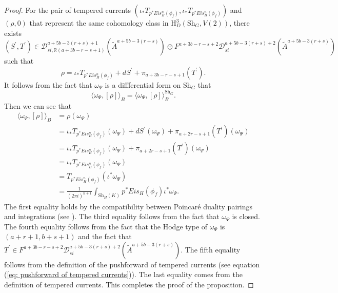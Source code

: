 \documentclass[11pt, a4paper]{amsart}
\theoremstyle{plain}
\theoremstyle{definition}
\numberwithin{equation}{section}
\def\RR{\mathbb{R}}
\newcommand{\Sh}{\mathrm{Sh}}
\begin{document}
\begin{proof}
    For the pair of tempered currents $(\iota_{*}T_{p^{*}Eis_{H}^{n}(\phi_f)}, \iota_{*} T_{p^{*}Eis_{B}^{n}(\phi_f)})$ and $(\rho, 0)$ that represent the same cohomology class in $\mathrm{H}^{3}_{D} (\Sh_{G}, V(2))$, there exists 
    \begin{equation*}
        (S^{\prime}, T^{\prime}) \in \mathcal{D}_{si, \RR(a + 3b -r - s + 1)}^{a + 5b - 3(r + s) + 1}(\widetilde{A}^{a + 5b - 3(r + s)}) \oplus F^{a + 3b -r - s + 2} \mathcal{D}_{si}^{a + 5b - 3(r + s) + 2}(\widetilde{A}^{a + 5b - 3(r + s)})
    \end{equation*}
    such that 
    \begin{equation*}
        \rho = \iota_{*}T_{p^{*}Eis_{H}^{n}(\phi_f)} + dS^{\prime} + \pi_{a + 3b -r -s + 1} (T^{\prime}). 
    \end{equation*}
    It follows from the fact that $\omega_{\Psi}$ is a diffferential form on $\Sh_{G}$ that 
    \begin{equation*}
        \langle \omega_{\Psi}, [\rho] \rangle_{B} = \langle \omega_{\Psi}, [\rho] \rangle_{B}^{\Sh_{G}}. 
    \end{equation*}
    Then we can see that 
    \begin{align*}
        \langle \omega_{\Psi}, [\rho] \rangle_{B}         &= \rho(\omega_{\Psi}) \\
                                                          &= \iota_{*}T_{p^{*}Eis_{H}^{n}(\phi_f)} (\omega_{\Psi}) + dS^{\prime} (\omega_{\Psi}) + \pi_{a + 2r -s + 1} (T^{\prime}) (\omega_{\Psi}) \\
                                                          &= \iota_{*}T_{p^{*}Eis_{H}^{n}(\phi_f)} (\omega_{\Psi}) + \pi_{a + 2r -s + 1} (T^{\prime}) (\omega_{\Psi}) \\
                                                          &= \iota_{*}T_{p^{*}Eis_{H}^{n}(\phi_f)} (\omega_{\Psi}) \\
                                                          &= T_{p^{*}Eis_{H}^{n}(\phi_f)} (\iota^{*}\omega_{\Psi}) \\
                                                          &= \frac{1}{(2\pi i)^{n + 1}} \int_{\Sh_H(K)} p^{*} Eis_{H}(\phi_f) \iota^{*} \omega_{\Psi}. 
    \end{align*}   
    The first equality holds by the compatibility between Poincar\'{e} duality pairings and integrations (see \cite[Prop.1.4.4.(c)]{Harris90}). 
    The third equality follows from the fact that $\omega_{\Psi}$ is closed. 
    The fourth equality follows from the fact that the Hodge type of $\omega_{\Psi}$ is $(a + r + 1, b + s + 1)$ and the fact that $T^{\prime} \in F^{a + 3b -r - s + 2} \mathcal{D}_{si}^{a + 5b - 3(r + s) + 2}(\widetilde{A}^{a + 5b - 3(r + s)})$. 
    The fifth  equality follows from the definition of the pushforward of tempered currents (see equation (\ref{eq: pushforward of tempered currents})). The last equality comes from the definition of tempered currents. This completes the proof of the proposition. 
\end{proof}
\end{document}
